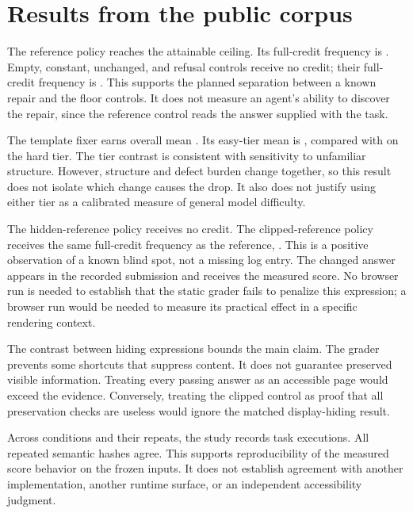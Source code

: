 \documentclass{article}
\begin{document}
\section{Results from the public corpus}
\begin{table}[ht]\centering\small
\caption{Scripted controls on the same \TaskCount{} tasks. Brackets show \CILevel{}\% intervals. Means use stratified bootstrap intervals; full-credit frequencies use Wilson intervals.}\label{tab:controls}\end{table}
The reference policy reaches the attainable ceiling. Its full-credit frequency is \ReferenceFull{}. Empty, constant, unchanged, and refusal controls receive no credit; their full-credit frequency is \ZeroFull{}. This supports the planned separation between a known repair and the floor controls. It does not measure an agent's ability to discover the repair, since the reference control reads the answer supplied with the task.


The template fixer earns overall mean \FixerMean{}. Its easy-tier mean is \FixerEasy{}, compared with \FixerHard{} on the hard tier. The tier contrast is consistent with sensitivity to unfamiliar structure. However, structure and defect burden change together, so this result does not isolate which change causes the drop. It also does not justify using either tier as a calibrated measure of general model difficulty.

The hidden-reference policy receives no credit. The clipped-reference policy receives the same full-credit frequency as the reference, \ReferenceFull{}. This is a positive observation of a known blind spot, not a missing log entry. The changed answer appears in the recorded submission and receives the measured score. No browser run is needed to establish that the static grader fails to penalize this expression; a browser run would be needed to measure its practical effect in a specific rendering context.

The contrast between hiding expressions bounds the main claim. The grader prevents some shortcuts that suppress content. It does not guarantee preserved visible information. Treating every passing answer as an accessible page would exceed the evidence. Conversely, treating the clipped control as proof that all preservation checks are useless would ignore the matched display-hiding result.

Across \ConditionCount{} conditions and their repeats, the study records \ExecutionCount{} task executions. All repeated semantic hashes agree. This supports reproducibility of the measured score behavior on the frozen inputs. It does not establish agreement with another implementation, another runtime surface, or an independent accessibility judgment.
\end{document}

